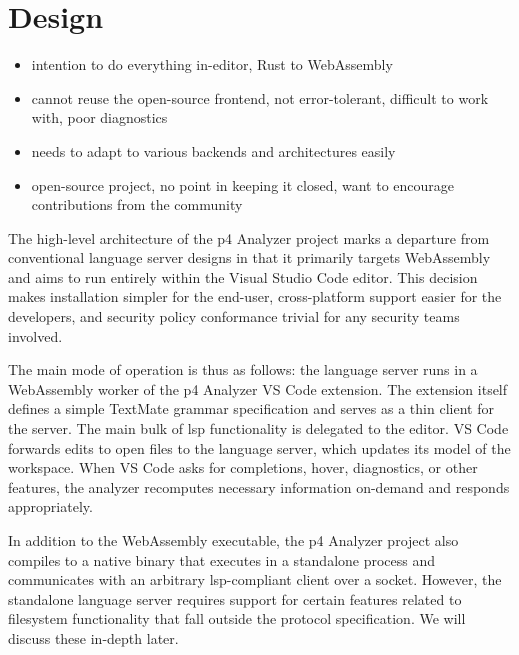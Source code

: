 \chapter{Design}


\begin{itemize}
	\item intention to do everything in-editor, Rust to WebAssembly
	\item cannot reuse the open-source frontend, not error-tolerant, difficult
	to work with, poor diagnostics
	\item needs to adapt to various backends and architectures easily
	\item open-source project, no point in keeping it closed, want to encourage
	contributions from the community
\end{itemize}

The high-level architecture of the \acrshort{p4} Analyzer project marks a
departure from conventional language server designs in that it primarily targets
WebAssembly and aims to run entirely within the Visual Studio Code editor. This
decision makes installation simpler for the end-user, cross-platform support
easier for the developers, and security policy conformance trivial for any
security teams involved.

The main mode of operation is thus as follows: the language server runs in a
WebAssembly worker of the \acrshort{p4} Analyzer VS Code extension. The
extension itself defines a simple TextMate\cite{textmate} grammar specification
and serves as a thin client for the server. The main bulk of \acrshort{lsp}
functionality is delegated to the editor. VS Code forwards edits to open files
to the language server, which updates its model of the workspace. When VS Code
asks for completions, hover, diagnostics, or other features, the analyzer
recomputes necessary information on-demand and responds appropriately.

In addition to the WebAssembly executable, the \acrshort{p4} Analyzer project
also compiles to a native binary that executes in a standalone process and
communicates with an arbitrary \acrshort{lsp}-compliant client over a socket.
However, the standalone language server requires support for certain features
related to filesystem functionality that fall outside the protocol
specification. We will discuss these in-depth later.

